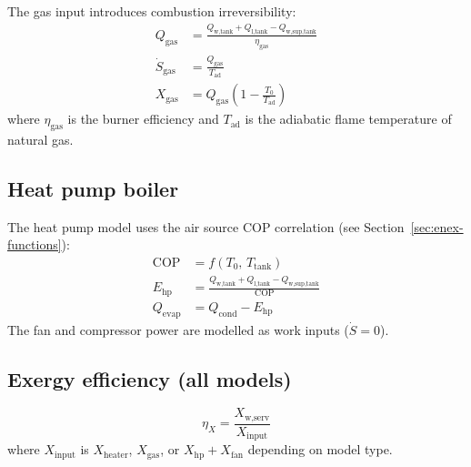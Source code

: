 The gas input introduces combustion irreversibility:
\begin{align}
  Q_\text{gas} &= \frac{Q_\text{w,tank} + Q_\text{l,tank} - Q_\text{w,sup,tank}}{\eta_\text{gas}} \label{eq:gb-Qgas} \\
  \dot{S}_\text{gas} &= \frac{Q_\text{gas}}{T_\text{ad}} \label{eq:gb-Sgas} \\
  X_\text{gas} &= Q_\text{gas}\left(1 - \frac{T_0}{T_\text{ad}}\right) \label{eq:gb-Xgas}
\end{align}
where $\eta_\text{gas}$ is the burner efficiency and $T_\text{ad}$ is the adiabatic flame temperature of natural gas.

\subsection{Heat pump boiler}

The heat pump model uses the air source COP correlation (see Section~\ref{sec:enex-functions}):
\begin{align}
  \text{COP} &= f(T_0,\,T_\text{tank}) \label{eq:hpb-COP}\\
  E_\text{hp} &= \frac{Q_\text{w,tank} + Q_\text{l,tank} - Q_\text{w,sup,tank}}{\text{COP}} \label{eq:hpb-Ehp}\\
  Q_\text{evap} &= Q_\text{cond} - E_\text{hp} \label{eq:hpb-Qevap}
\end{align}
The fan and compressor power are modelled as work inputs ($\dot{S} = 0$).

\subsection{Exergy efficiency (all models)}

\begin{equation}\label{eq:dhw-Xeff}
  \eta_X = \frac{X_\text{w,serv}}{X_\text{input}}
\end{equation}
where $X_\text{input}$ is $X_\text{heater}$, $X_\text{gas}$, or $X_\text{hp} + X_\text{fan}$ depending on model type.
